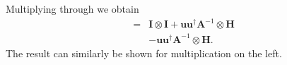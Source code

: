  Multiplying through we obtain
 \begin{align}
 =& \mathbf{I} \otimes \mathbf{I} + \mathbf{u}\mathbf{u}^\dagger\mathbf{A}^{-1} \otimes \mathbf{H} \nonumber 
\\ &- \mathbf{u}\mathbf{u}^\dagger\mathbf{A}^{-1} \otimes \mathbf{H}.
\end{align}
The result can similarly be shown for multiplication on the left.
